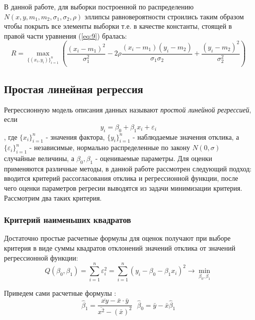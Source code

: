 \documentclass[12pt,a4paper]{article}
\begin{document}
В данной работе, для выборки построенной по распределению $N(x, y, m_1, m_2, \sigma_1, \sigma_2, \rho)$ эллипсы равновероятности строились таким образом чтобы покрыть все элементы выборки т.е. в качестве константы, стоящей в правой части уравнения (\ref{eq:9}) бралась:
\begin{equation}
	R = \max_{\{(x_i, y_i)\}_{i=1}^n}{\left(\frac{(x_i - m_1)^2}{\sigma_1^2} - 2\rho\frac{(x_i - m_1)(y_i - m_2)}{\sigma_1\sigma_2} + \frac{(y_i - m_2)^2}{\sigma_2^2}\right)}
\end{equation}

\subsection{Простая линейная регрессия}
Регрессионную модель описания данных называют \textit{простой линейной регрессией}, если
\begin{equation}
y_i = \beta_0 + \beta_1 x_i + \varepsilon_i
\end{equation}
, где $\{x_i\}_{i=1}^n$ - значения фактора, $\{y_i\}_{i=1}^n$ - наблюдаемые значения отклика, а $\{\varepsilon_i\}_{i=1}^n$ - независимые, нормально распределенные по закону $N(0, \sigma)$ случайные величины, а $\beta_0, \beta_1$ - оцениваемые параметры\cite[стр. 507]{verrazdely}. Для оценки применяются различные методы, в данной работе рассмотрен следующий подход: вводится критерий рассогласования отклика и регрессионной функции, после чего оценки параметров регресии выводятся из задачи минимизации критерия. Рассмотрим два таких критерия.

\subsubsection{Критерий наименьших квадратов}
Достаточно простые расчетные формулы для оценок получают при выборе критерия в виде суммы квадратов отклонений значений отклика от значений регрессионной функции:
\begin{equation}\label{lab6:1}
Q\left(\beta_{0}, \beta_{1}\right)=\sum_{i=1}^{n} \varepsilon_i^{2}=\sum_{i=1}^{n}\left(y_{i}-\beta_{0}-\beta_{1} x_{i}\right)^{2} \rightarrow \min _{\beta_{0}, \beta_{1}}
\end{equation}

Приведем сами расчетные формулы \cite[стр. 509]{verrazdely}:
\begin{equation}
\widehat{\beta}_{1}=\frac{\overline{x y} - \bar{x} \cdot \bar{y}}{\overline{x^2} - (\bar{x})^{2}} \ \ \ \widehat{\beta}_{0}=\bar{y} - \bar{x} \widehat{\beta}_{1}
\end{equation}
\end{document}
